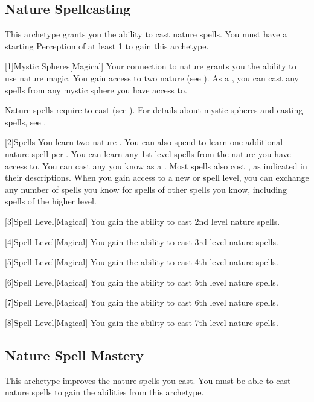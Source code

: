     \subsection{Nature Spellcasting}
        This archetype grants you the ability to cast nature spells.
        You must have a starting Perception of at least 1 to gain this archetype.

        [1]{Mystic Spheres}[Magical]
        Your connection to nature grants you the ability to use nature magic.
        You gain access to two nature  (see ).
        As a , you can cast any  spells from any mystic sphere you have access to.

        Nature spells require  to cast (see ).
        For details about mystic spheres and casting spells, see .

        [2]{Spells} You learn two nature .
        You can also spend  to learn one additional nature spell per .
        You can learn any 1st level spells from the nature  you have access to.
        You can cast any  you know as a .
        Most spells also cost , as indicated in their descriptions.
        When you gain access to a new  or spell level, you can exchange any number of spells you know for spells of other spells you know, including spells of the higher level.

        [3]{Spell Level}[Magical] You gain the ability to cast 2nd level nature spells.

        [4]{Spell Level}[Magical] You gain the ability to cast 3rd level nature spells.

        [5]{Spell Level}[Magical] You gain the ability to cast 4th level nature spells.

        [6]{Spell Level}[Magical] You gain the ability to cast 5th level nature spells.

        [7]{Spell Level}[Magical] You gain the ability to cast 6th level nature spells.

        [8]{Spell Level}[Magical] You gain the ability to cast 7th level nature spells.

    \subsection{Nature Spell Mastery}
        This archetype improves the nature spells you cast.
        You must be able to cast nature spells to gain the abilities from this archetype.

